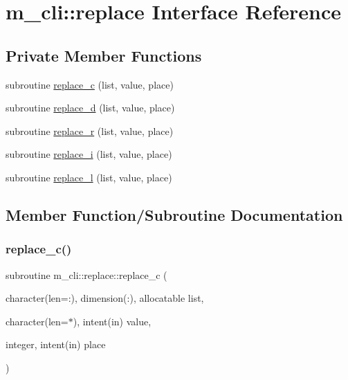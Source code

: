 \hypertarget{interfacem__cli_1_1replace}{}\section{m\+\_\+cli\+:\+:replace Interface Reference}
\label{interfacem__cli_1_1replace}
\subsection*{Private Member Functions}
\begin{DoxyCompactItemize}
\item 
subroutine \mbox{\hyperlink{interfacem__cli_1_1replace_ae1cfecec71387e484a12f7e02416327b}{replace\+\_\+c}} (list, value, place)
\item 
subroutine \mbox{\hyperlink{interfacem__cli_1_1replace_acc8e55b73266f8ec6841359b46c032a5}{replace\+\_\+d}} (list, value, place)
\item 
subroutine \mbox{\hyperlink{interfacem__cli_1_1replace_abf109545f37e44c1f6cc0176c75ef738}{replace\+\_\+r}} (list, value, place)
\item 
subroutine \mbox{\hyperlink{interfacem__cli_1_1replace_abc84f285072aca38fb5b9464b9ee7401}{replace\+\_\+i}} (list, value, place)
\item 
subroutine \mbox{\hyperlink{interfacem__cli_1_1replace_ac9f0196d45313ed60d0c0368fc2fd444}{replace\+\_\+l}} (list, value, place)
\end{DoxyCompactItemize}


\subsection{Member Function/\+Subroutine Documentation}
\mbox{\label{interfacem__cli_1_1replace_ae1cfecec71387e484a12f7e02416327b}} 
\subsubsection{\texorpdfstring{replace\+\_\+c()}{replace\_c()}}
{\footnotesize\ttfamily subroutine m\+\_\+cli\+::replace\+::replace\+\_\+c (\begin{DoxyParamCaption}\item[{character(len=\+:), dimension(\+:), allocatable}]{list,  }\item[{character(len=$\ast$), intent(in)}]{value,  }\item[{integer, intent(in)}]{place }\end{DoxyParamCaption})\hspace{0.3cm}{\ttfamily [private]}}

